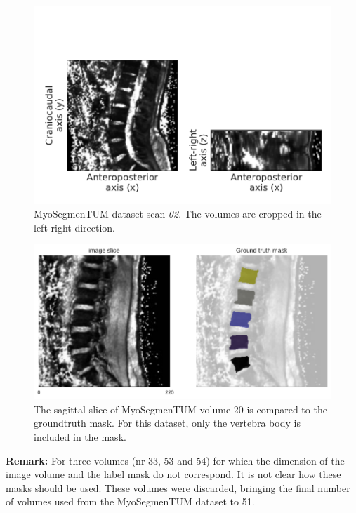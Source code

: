 \begin{figure}
    \centering
    \includegraphics[width=.95\textwidth]{automated_graphs/OSF_02.pdf}
    \caption{MyoSegmenTUM dataset scan \textit{02}. 
    The volumes are cropped in the left-right direction. 
    \label{fig:OSF_02}}
\end{figure}

\begin{figure}
    \centering
    \includegraphics[width=.95\textwidth]{images/MyoSegmenTUM020_s21_mask.pdf}
    \caption{The sagittal slice of MyoSegmenTUM volume 20 is compared to the \Gls{groundtruth} mask.
    For this dataset, only the vertebra body is included in the mask. 
    \protect
    }
\end{figure}

\textbf{Remark:} For three volumes (nr 33, 53 and 54) for which the dimension of the image volume and the label mask do not correspond. 
It is not clear how these masks should be used. 
These volumes were discarded, bringing the final number of volumes used from the MyoSegmenTUM dataset to 51.